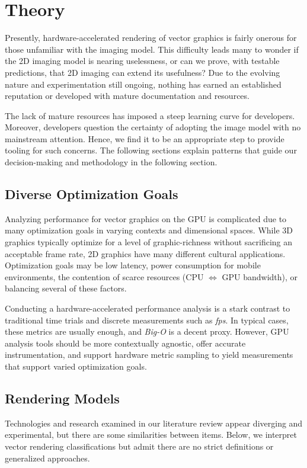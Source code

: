 \chapter{Theory}\label{sec:theory}
Presently, hardware-accelerated rendering of vector graphics is fairly onerous for those unfamiliar with the imaging model. This difficulty leads many to wonder if the 2D imaging model is nearing uselessness, or can we prove, with testable predictions, that 2D imaging can extend its usefulness? Due to the evolving nature and experimentation still ongoing, nothing has earned an established reputation or developed with mature documentation and resources.\medskip

The lack of mature resources has imposed a steep learning curve for developers. Moreover, developers question the certainty of adopting the image model with no mainstream attention. Hence, we find it to be an appropriate step to provide tooling for such concerns. The following sections explain patterns that guide our decision-making and methodology in the following section.

\section{Diverse Optimization Goals}\label{sec:optimization_goals}
Analyzing performance for vector graphics on the GPU is complicated due to many optimization goals in varying contexts and dimensional spaces. While 3D graphics typically optimize for a level of graphic-richness without sacrificing an acceptable frame rate, 2D graphics have many different cultural applications. Optimization goals may be low latency, power consumption for mobile environments, the contention of scarce resources (CPU $\Leftrightarrow$ GPU bandwidth), or balancing several of these factors.\medskip

Conducting a hardware-accelerated performance analysis is a stark contrast to traditional time trials and discrete measurements such as \textit{fps}. In typical cases, these metrics are usually enough, and \emph{Big-O} is a decent proxy. However, GPU analysis tools should be more contextually agnostic, offer accurate instrumentation, and support hardware metric sampling to yield measurements that support varied optimization goals.

\section{Rendering Models}
Technologies and research examined in our literature review appear diverging and experimental, but there are some similarities between items. Below, we interpret vector rendering classifications but admit there are no strict definitions or generalized approaches.

